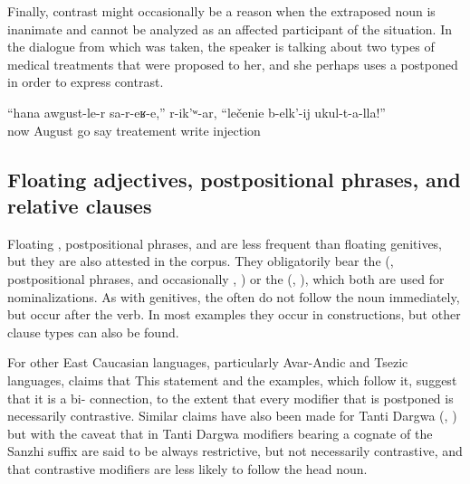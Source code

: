 Finally, contrast might occasionally be a reason when the extraposed noun is inanimate and cannot be analyzed as an affected participant of the situation. In the dialogue from which  was taken, the speaker is talking about two types of medical treatments that were proposed to her, and she perhaps uses a postponed  in order to express contrast.
%
\begin{exe}
	\ex	\label{ex:She said, come now in August, to prescribe the cure of injections}
	\gll	``hana	awgust-le-r	sa-r-eʁ-e,''	r-ik'ʷ-ar,	``lečenie	b-elk'-ij ukul-t-a-lla!''\\
		now	August	go	say	treatement	write	injection\\
	\glt	{}
\end{exe}



\subsection{Floating adjectives, postpositional phrases, and relative clauses}
\label{ssec:Extraposed adjectives, postpositional phrases, and relative clauses}

Floating , postpositional phrases, and  are less frequent than floating genitives, but they are also attested in the corpus. They obligatorily bear the   (, postpositional phrases, and occasionally , ) or the   (, ), which both are used for nominalizations. As with genitives, the  often do not follow the noun immediately, but occur after the verb. In most examples they occur in  constructions, but other clause types can also be found.

For other East Caucasian languages, particularly Avar-Andic and Tsezic languages, \citet{Testelec1998a} claims that  This statement and the examples, which follow it, suggest that it is a bi- connection, to the extent that every modifier that is postponed is necessarily contrastive. Similar claims have also been made for Tanti Dargwa (\citealt{Lander2014, Lander2016}, \citealt{Sumbatova.Lander2014}) but with the caveat that in Tanti Dargwa modifiers bearing a cognate of the Sanzhi suffix  are said to be always restrictive, but not necessarily contrastive, and that contrastive modifiers are less likely to follow the head noun.

